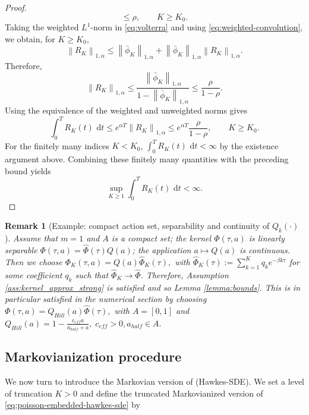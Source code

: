 \documentclass[11pt]{article}
\theoremstyle{remarkitalic}
\theoremstyle{remarkitalic}
\newtheorem{remark}[theorem]{Remark}
\newcommand{\dd}{\,\mathrm d}
\newcommand{\1}{\mathbf 1}
\newcommand{\norm}[1]{\left\lVert #1 \right\rVert}
\begin{document}
\begin{proof}
\[    \le
    \rho,
    \qquad K\ge K_0.
\] Taking the weighted $L^1$-norm in \eqref{eq:volterra} and using
\eqref{eq:weighted-convolution}, we obtain, for $K\ge K_0$,
\[
    \norm{R_K}_{1,\alpha}
    \le
    \norm{\bar\phi_K}_{1,\alpha}
    +
    \norm{\bar\phi_K}_{1,\alpha}
    \norm{R_K}_{1,\alpha}.
\]
Therefore,
\[
    \norm{R_K}_{1,\alpha}
    \le
    \frac{
        \norm{\bar\phi_K}_{1,\alpha}
    }{
        1-\norm{\bar\phi_K}_{1,\alpha}
    }
    \le
    \frac{\rho}{1-\rho}.
\]
Using the equivalence of the weighted and unweighted norms gives
\[
    \int_0^T R_K(t)\,\dd t
    \le
    e^{\alpha T}
    \norm{R_K}_{1,\alpha}
    \le
    e^{\alpha T}
    \frac{\rho}{1-\rho},
    \qquad K\ge K_0.
\]
For the finitely many indices $K<K_0$,
$\int_0^T R_K(t)\,\dd t<\infty$ by the existence argument above.
Combining these finitely many quantities with the preceding bound
yields
\[
    \sup_{K\ge1}
    \int_0^T R_K(t)\,\dd t
    <\infty.
\]
\end{proof}



\begin{remark}[Example: compact action set, separability and continuity of $Q_k(\cdot)$]
    Assume that  $m=1$ and $A$ is a compact set; the kernel $\Phi(\tau,a)$ is linearly separable $\Phi(\tau,a)=\hat{\Phi}(\tau)Q(a)$; the application $a\longmapsto Q(a)$ is continuous. Then we choose $\Phi_K(\tau,a)=Q(a)\hat{\Phi}_K(\tau),$ with $\hat{\Phi}_K(\tau):=\sum_{k=1}^K q_k e^{-\beta k\tau}$ for some coefficient $q_k$ such that $\hat{\Phi}_K\longrightarrow \hat{\Phi}$. Therefore, Assumption \ref{ass:kernel_approx_strong} is satisfied and so Lemma \ref{lemma:bounds}. This is in particular satisfied in the numerical section by choosing
    $\Phi(\tau,a)=Q_{Hill}(a) \hat{\Phi}(\tau),$
    with $A=[0,1]$ and
    $Q_{Hill}(a)=1-\frac{c_{eff} a}{a_{half}+a},\; c_{eff}>0,a_{half}\in A.$
\end{remark}



\subsection{Markovianization procedure}

We now turn to introduce the Markovian version of (Hawkes-SDE). We set a level of truncation $K>0$ and define the truncated Markovianized version of \eqref{eq:poisson-embedded-hawkes-sde} by
\end{document}

